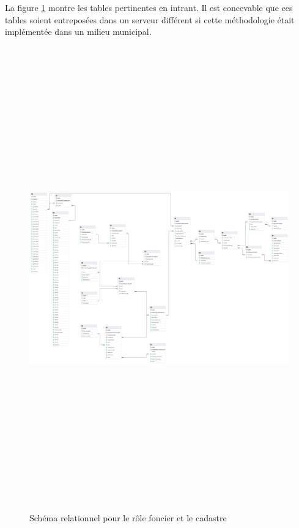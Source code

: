     La figure \ref{fig:offstreet_db_erd_input_data} montre les tables pertinentes en intrant. Il est concevable que ces tables soient entreposées dans un serveur différent si cette méthodologie était implémentée dans un milieu municipal.
    \begin{figure}[ht!]
        \centering
        \includegraphics[trim={0cm 6cm 77.5cm 0cm},clip,height=20cm]{images/structure_base_de_donnee.png}
        \caption{Schéma relationnel pour le rôle foncier et le cadastre}
        \label{fig:offstreet_db_erd_input_data}
    \end{figure}
    \FloatBarrier
